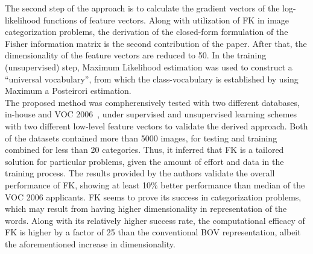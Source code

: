 \documentclass[11pt]{article}
\begin{document}
The second step of the approach is to calculate the gradient vectors of the log-likelihood functions of feature vectors.
Along with utilization of FK in image categorization problems, the derivation of the closed-form formulation of the Fisher information matrix is the second contribution of the paper.
After that, the dimensionality of the feature vectors are reduced to 50.
In the training (unsupervised) step, Maximum Likelihood estimation was used to construct a ``universal vocabulary''\cite{perronnin2007fisher}, from which the class-vocabulary is established by using Maximum a Posteirori estimation. \\
\indent The proposed method was compherensively tested with two different databases, in-house and VOC 2006~\cite{voc-2006}, under supervised and unsupervised learning schemes with two different low-level feature vectors to validate the derived approach.
Both of the datasets contained more than 5000 images, for testing and training combined for less than 20 categories.
Thus, it inferred that FK is a tailored solution for particular problems, given the amount of effort and data in the training process.
The results provided by the authors validate the overall performance of FK, showing at least 10\% better performance than median of the VOC 2006 applicants.
FK seems to prove its success in categorization problems, which may result from having higher dimensionality in representation of the words.
Along with its relatively higher success rate, the computational efficacy of FK is higher by a factor of 25 than the conventional BOV representation, albeit the aforementioned  increase in dimensionality.


\end{document}
